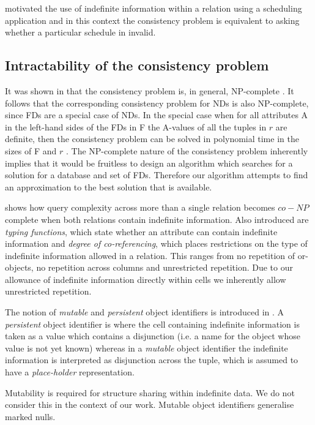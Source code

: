 \cite{inv91} motivated the use of indefinite information within a 
relation using a scheduling application and in this context the consistency problem is equivalent to
asking whether a particular schedule in invalid.

\subsection{Intractability of the consistency problem}

It was shown in \cite{vn95} that the consistency problem is,
in general, NP-complete \cite{gj79}.  It follows that the 
corresponding consistency problem for NDs is also
NP-complete, since FDs are a special case of NDs.
In the special case when for all attributes A in the left-hand sides 
of the FDs in F the A-values of all the tuples in $r$ are definite,
then the consistency problem can be solved in polynomial time
in the sizes of F and $r$ \cite{vn95}.
The NP-complete nature of the consistency problem inherently
implies that it would be fruitless to design an algorithm which
searches for a solution for a database and set of FDs. Therefore
our algorithm attempts to find an approximation to the best
solution that is available.

\cite{ivv95} shows how query complexity across more
than a single relation becomes
$co-NP$ complete when both relations contain indefinite information. Also 
introduced are {\em typing functions}, which state whether an
attribute can contain indefinite information and {\em degree of 
co-referencing}, which places restrictions on
the type of indefinite information allowed in a relation. This ranges
from no repetition of or-objects, no repetition across columns and
unrestricted repetition. Due to our allowance of indefinite
information directly within cells we inherently allow unrestricted repetition.
\medskip

The notion of {\em mutable} and {\em persistent} object identifiers is
introduced in \cite{inv91}. A {\em persistent} object identifier is where the cell
containing indefinite information is taken as a value which contains a
disjunction (i.e. a name for the object whose value is not yet known)
 whereas in a {\em mutable} object identifier the indefinite
information is interpreted as disjunction across the tuple, which
is assumed to have a {\em place-holder } representation.

Mutability is required for structure sharing within indefinite data.
We do not consider this in the context of our work. Mutable object
identifiers generalise marked nulls. 

